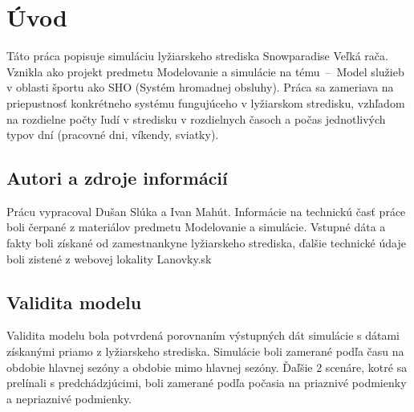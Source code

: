 \section{Úvod}
Táto práca popisuje simuláciu\cite[str. 5]{ims} lyžiarskeho strediska Snowparadise Veľká rača. Vznikla ako projekt predmetu Modelovanie a simulácie na tému
\,--\, Model služieb v oblasti športu ako SHO (Systém hromadnej obsluhy\cite[str. 33]{ims}). Práca sa zameriava na priepustnosť konkrétneho systému\cite[str. 6]{ims} fungujúceho v 
lyžiarskom stredisku, vzhľadom na rozdielne počty ľudí v stredisku v rozdielnych časoch a počas jednotlivých typov dní (pracovné dni, víkendy, sviatky).

\subsection{Autori a zdroje informácií}
Prácu vypracoval Dušan Slúka a Ivan Mahút. Informácie na technickú časť práce boli čerpané z materiálov predmetu Modelovanie a simulácie. Vstupné dáta a fakty
boli získané od zamestnankyne lyžiarskeho strediska, ďalšie technické údaje boli zistené z webovej lokality Lanovky.sk\cite{lanovky}

\subsection{Validita modelu}
Validita modelu bola potvrdená porovnaním výstupných dát simulácie s dátami získanými priamo z lyžiarskeho strediska.
Simulácie boli zamerané podľa času na obdobie hlavnej sezóny a obdobie mimo hlavnej sezóny. Ďaľšie 2 scenáre, kotré sa prelínali s predchádzjúcimi,
boli zamerané podľa počasia na priaznivé podmienky a nepriaznivé podmienky.
